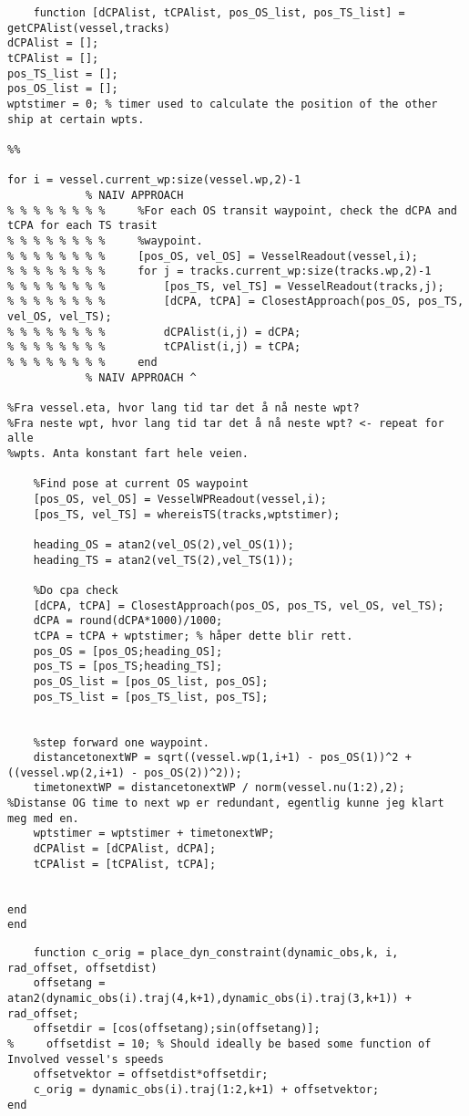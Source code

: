 \clearpage
\begin{lstlisting}
    function [dCPAlist, tCPAlist, pos_OS_list, pos_TS_list] = getCPAlist(vessel,tracks)
dCPAlist = [];
tCPAlist = [];
pos_TS_list = [];
pos_OS_list = [];
wptstimer = 0; % timer used to calculate the position of the other ship at certain wpts.

%%

for i = vessel.current_wp:size(vessel.wp,2)-1
            % NAIV APPROACH
% % % % % % % %     %For each OS transit waypoint, check the dCPA and tCPA for each TS trasit
% % % % % % % %     %waypoint.
% % % % % % % %     [pos_OS, vel_OS] = VesselReadout(vessel,i);
% % % % % % % %     for j = tracks.current_wp:size(tracks.wp,2)-1
% % % % % % % %         [pos_TS, vel_TS] = VesselReadout(tracks,j);
% % % % % % % %         [dCPA, tCPA] = ClosestApproach(pos_OS, pos_TS, vel_OS, vel_TS);
% % % % % % % %         dCPAlist(i,j) = dCPA;
% % % % % % % %         tCPAlist(i,j) = tCPA;
% % % % % % % %     end
            % NAIV APPROACH ^

%Fra vessel.eta, hvor lang tid tar det å nå neste wpt?
%Fra neste wpt, hvor lang tid tar det å nå neste wpt? <- repeat for alle
%wpts. Anta konstant fart hele veien.

    %Find pose at current OS waypoint
    [pos_OS, vel_OS] = VesselWPReadout(vessel,i);
    [pos_TS, vel_TS] = whereisTS(tracks,wptstimer); 

    heading_OS = atan2(vel_OS(2),vel_OS(1));
    heading_TS = atan2(vel_TS(2),vel_TS(1));

    %Do cpa check
    [dCPA, tCPA] = ClosestApproach(pos_OS, pos_TS, vel_OS, vel_TS);
    dCPA = round(dCPA*1000)/1000;
    tCPA = tCPA + wptstimer; % håper dette blir rett.
    pos_OS = [pos_OS;heading_OS];
    pos_TS = [pos_TS;heading_TS];
    pos_OS_list = [pos_OS_list, pos_OS];
    pos_TS_list = [pos_TS_list, pos_TS];


    %step forward one waypoint.
    distancetonextWP = sqrt((vessel.wp(1,i+1) - pos_OS(1))^2 + ((vessel.wp(2,i+1) - pos_OS(2))^2));
    timetonextWP = distancetonextWP / norm(vessel.nu(1:2),2); %Distanse OG time to next wp er redundant, egentlig kunne jeg klart meg med en.
    wptstimer = wptstimer + timetonextWP;
    dCPAlist = [dCPAlist, dCPA];
    tCPAlist = [tCPAlist, tCPA];

  
end
end
\end{lstlisting}

\clearpage
\begin{lstlisting}
    function c_orig = place_dyn_constraint(dynamic_obs,k, i, rad_offset, offsetdist)
    offsetang = atan2(dynamic_obs(i).traj(4,k+1),dynamic_obs(i).traj(3,k+1)) + rad_offset;
    offsetdir = [cos(offsetang);sin(offsetang)];
%     offsetdist = 10; % Should ideally be based some function of Involved vessel's speeds
    offsetvektor = offsetdist*offsetdir;
    c_orig = dynamic_obs(i).traj(1:2,k+1) + offsetvektor;
end
\end{lstlisting}

